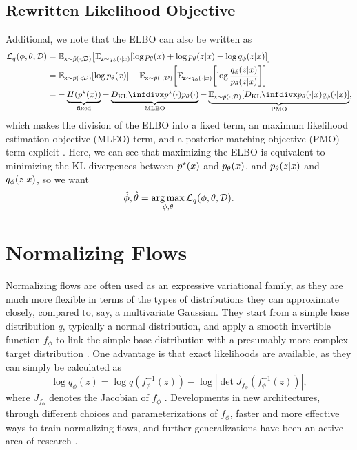 \subsection{Rewritten Likelihood Objective}
Additional, we note that the ELBO can also be written as
\begin{align}
    \elbo{q}{\phi, \theta, \Data}
    &= \EX{\rx \sim \ped{\cdot;\Data}}{ \EX{\rz \sim \qvd{\cdot\given x}}{\log \pld{x} + \log \pld{z\given x} - \log \qvd{z\given x}} }\\
    &= \EX{\rx \sim \ped{\cdot;\Data}}{\log\pld{x}} -\EX{\rx \sim \ped{\cdot;\Data}}{\EX{\rz \sim \qvd{\cdot\given x}}{ \log \frac{\qvd{z\given x}}{\pld{z\given x}}} }\\
    &= 
    -\underbrace{H(\ptd{x})}_{\text{fixed}}
    -\underbrace{\DKL{\ptd{\cdot}}{\pld{\cdot}}}_{\text{MLEO}} 
    -\underbrace{\EX{\rx \sim \ped{\cdot;\Data}}{\DKL{\pld{\cdot\given x}}{\qvd{\cdot\given x}}}}_{\text{PMO}},
\end{align}
which makes the division of the ELBO into a fixed term, an maximum likelihood estimation objective (MLEO) term, and a posterior matching objective (PMO) term explicit \cite{yacoby2020failure}. Here, we can see that maximizing the ELBO is equivalent to minimizing the KL-divergences between $\ptd{x}$ and $\pld{x}$, and $\pld{z\given x}$ and $\qvd{z\given x}$, so we want
\begin{equation}
    \hat\phi,\hat\theta = \argmax_{\phi,\theta} \elbo{q}{\phi,\theta, \Data}.
\end{equation}

\section{Normalizing Flows}

Normalizing flows are often used as an expressive variational family, as they are much more flexible in terms of the types of distributions they can approximate closely, compared to, say, a multivariate Gaussian. They start from a simple base distribution $q$, typically a normal distribution, and apply a smooth invertible function $f_\phi$ to link the simple base distribution with a presumably more complex target distribution \cite{rezende2016variationalinferencenormalizingflows}. One advantage is that exact likelihoods are available, as they can simply be calculated as 
\begin{equation}
    \log q_\phi(z) = \log q\left(f_\phi^{-1}(z)\right) -\log\left|\det J_{f_\phi}\left(f_\phi^{-1}(z)\right)\right|,
\end{equation}
where $J_{f_\phi}$ denotes the Jacobian of $f_\phi$ \cite{Kobyzev_2021}. Developments in new architectures, through different choices and parameterizations of $f_\phi$, faster and more effective ways to train normalizing flows, and further generalizations have been an active area of research \cite{onken2021otflowfastaccuratecontinuous, lipman2023flowmatchinggenerativemodeling, holderrieth2025generatormatchinggenerativemodeling}.
